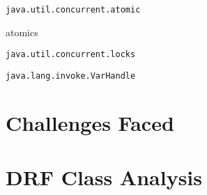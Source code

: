 \begin{verbatim}
java.util.concurrent.atomic
\end{verbatim}
atomics

\begin{verbatim}
java.util.concurrent.locks
\end{verbatim}


\begin{verbatim}
java.lang.invoke.VarHandle
\end{verbatim}


\section{Challenges Faced}


\section{DRF Class Analysis}




